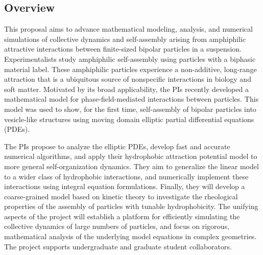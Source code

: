 \documentclass[11pt]{article}
\begin{document}


\subsection*{Overview}
\vspace{-0.1in}
This proposal aims to advance mathematical modeling, analysis, and
numerical simulations of collective dynamics and self-assembly arising
from amphiphilic attractive interactions between finite-sized bipolar
particles in a suspension. Experimentalists study amphiphilic
self-assembly using particles with a biphasic
material label.
These amphiphilic particles experience a non-additive, long-range
attraction that is a ubiquitous source of nonspecific interactions in
biology and soft matter. Motivated by its broad applicability, the PIs
recently developed a mathematical model for phase-field-mediated
interactions between particles. This model was used to show, for the
first time, self-assembly of bipolar particles into vesicle-like
structures using moving domain elliptic partial differential equations
(PDEs).

The PIs propose to analyze the elliptic PDEs, develop fast and accurate
numerical algorithms, and apply their hydrophobic attraction potential
model to more general self-organization dynamics. They aim to generalize
the linear model to a wider class of hydrophobic interactions, and
numerically implement these interactions using integral equation
formulations. Finally, they will develop a coarse-grained model based on
kinetic theory to investigate the rheological properties of the assembly
of particles with tunable hydrophobicity. The unifying aspects of the
project will establish a platform for efficiently simulating the
collective dynamics of large numbers of particles, and focus on
rigorous, mathematical analysis of the underlying model equations in
complex geometries. The project supports undergraduate and graduate
student collaborators.

\vspace{-0.1in}
\end{document}
